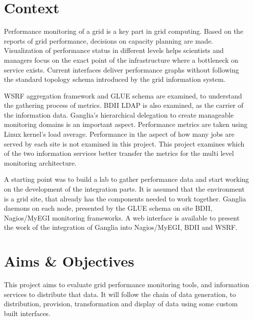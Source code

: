 
\section{Context}

Performance monitoring of a grid is a key part in grid computing. Based on the reports of grid performance, decisions on capacity planning are made. Visualization of performance status in different levels helps scientists and managers focus on the exact point of the infrastructure where a bottleneck on service exists.
Current interfaces deliver performance graphs without following the standard topology schema introduced by the grid information system.

WSRF aggregation framework and GLUE schema are examined, to understand the gathering process of metrics. BDII LDAP is also examined, as the carrier of the information data. Ganglia's hierarchical delegation to create manageable monitoring domains is an important aspect. Performance metrics are taken using Linux kernel's load average.
Performance in the aspect of how many jobs are served by each site is not examined in this project.
This project examines which of the two information services better transfer the metrics for the multi level monitoring architecture.

A starting point was to build a lab to gather performance data and start working on the development of the integration parts.
It is assumed that the environment is a grid site, that already has the components needed to work together. Ganglia daemons on each node, presented by the GLUE schema on site BDII, Nagios/MyEGI monitoring frameworks.
A web interface is available to present the work of the integration of Ganglia into Nagios/MyEGI, BDII and WSRF.

\section{Aims \& Objectives}

This project aims to evaluate grid performance monitoring tools, and information services to distribute that data. It will follow the chain of data generation, to distribution, provision, transformation and display of data using some custom built interfaces.

